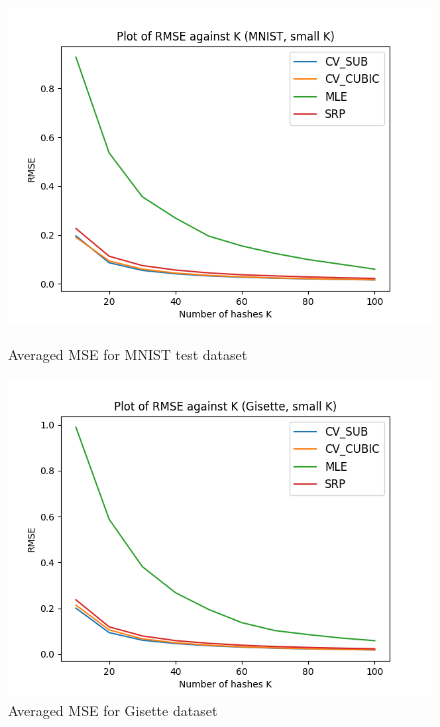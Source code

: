 \documentclass[runningheads]{llncs}
\begin{document}
        \begin{figure}
        \centering
        \begin{minipage}{.45\columnwidth}
            \centering
            \includegraphics[width=\textwidth]{images/mnist_normal_mean.png}
            \caption{Averaged MSE for MNIST test dataset}
            \label{mnist:mean}
        \end{minipage}
        \hfill
        \begin{minipage}{.45\columnwidth}
            \centering
            \includegraphics[width=\textwidth]{images/gisette_normal_mean.png}
            \caption{Averaged MSE for Gisette dataset}
            \label{gisette:mean}
        \end{minipage}
    \end{figure}
    
\end{document}
